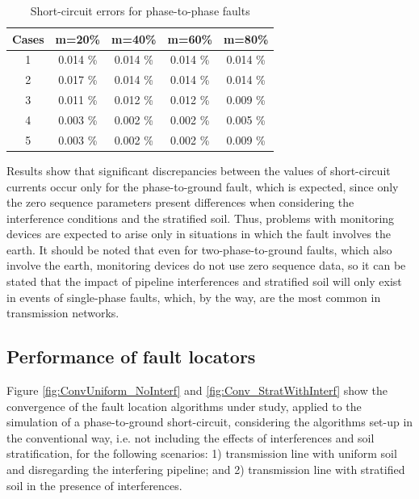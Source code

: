 \documentclass[conference]{IEEEtran}
\begin{document}
	\begin{table}[!hbt]
		\renewcommand{\arraystretch}{1.3}
		\caption{Short-circuit errors for phase-to-phase faults}
		\label{table:Ab_CC_E}
		\centering
		\begin{tabular}{|c|c|c|c|c|}
			\hline
			\textbf{Cases} & \textbf{m=20\%} & \textbf{m=40\%} & \textbf{m=60\%} & \textbf{m=80\%} \\ \hline
			1              & 0.014 \%        & 0.014 \%        & 0.014 \%        & 0.014 \%        \\ \hline
			2              & 0.017 \%        & 0.014 \%        & 0.014 \%        & 0.014 \%        \\ \hline
			3              & 0.011 \%        & 0.012 \%        & 0.012 \%        & 0.009 \%        \\ \hline
			4              & 0.003 \%        & 0.002 \%        & 0.002 \%        & 0.005 \%        \\ \hline
			5              & 0.003 \%        & 0.002 \%        & 0.002 \%        & 0.009 \%        \\ \hline
		\end{tabular}
	\end{table}
	
	Results show that significant discrepancies between the values of short-circuit currents occur only for the phase-to-ground fault, which is expected, since only the zero sequence parameters present differences when considering the interference conditions and the stratified soil. Thus, problems with monitoring devices are expected to arise only in situations in which the fault involves the earth. It should be noted that even for two-phase-to-ground faults, which also involve the earth, monitoring devices do not use zero sequence data, so it can be stated that the impact of pipeline interferences and stratified soil will only exist in events of single-phase faults, which, by the way, are the most common in transmission networks. 
	
	\subsection{Performance of fault locators}
	
	Figure \ref{fig:ConvUniform_NoInterf} and \ref{fig:Conv_StratWithInterf} show the convergence of the fault location algorithms under study, applied to the simulation of a phase-to-ground short-circuit, considering the algorithms set-up in the conventional way, i.e. not including the effects of interferences and soil stratification, for the following scenarios: 1) transmission line with uniform soil and disregarding the interfering pipeline; and 2) transmission line with stratified soil in the presence of interferences.
	
\end{document}
